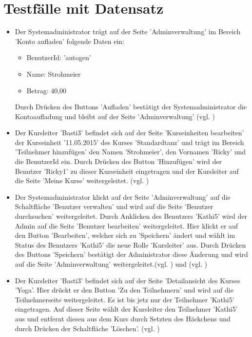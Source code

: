 \documentclass[a4paper]{scrreprt}
\newcounter{Lc}
\newcounter{Hc}
\newcommand{\stepHc}{\stepcounter{Hc}\setcounter{Lc}{0}}
\begin{document}
\section{Testfälle mit Datensatz}
			\stepHc
			\begin{itemize}
				
				\item {}
				Der Systemadministrator trägt auf der Seite 'Adminverwaltung' im Bereich 'Konto aufladen' folgende Daten ein:
				\begin{itemize}
					\item BenutzerId: 'autogen'
					\item Name: Strohmeier
					\item Betrag: 40,00
				\end{itemize}
				Durch Drücken des Buttons 'Aufladen' bestätigt der Systemadministrator die Kontoaufladung und bleibt auf der Seite 'Adminverwaltung' (vgl. )
				
				\item {}
				Der Kursleiter 'Basti3' befindet sich auf der Seite 'Kurseinheiten bearbeiten' der Kurseinheit '11.05.2015' des Kurses 'Standardtanz' und trägt im Bereich 'Teilnehmer hinzufügen' den Namen 'Strohmeier', den Vornamen 'Ricky' und die BenutzerId ein. Durch Drücken des Button 'Hinzufügen' wird der Benutzer 'Ricky1' zu dieser Kurseinheit eingetragen und der Kursleiter auf die Seite 'Meine Kurse' weitergeleitet. (vgl. )
						
				\item {} 
				Der Systemadministrator klickt auf der Seite 'Adminverwaltung' auf die Schaltfläche 'Benutzer verwalten' und wird auf die Seite 'Benutzer durchsuchen' weitergeleitet. Durch Anklicken des Benutzers 'Kathi5' wird der Admin auf die Seite 'Benutzer bearbeiten' weitergeleitet. Hier klickt er auf den Button 'Bearbeiten', welcher sich zu 'Speichern' ändert und wählt im Status des Benutzers 'Kathi5' die neue Rolle 'Kursleiter' aus. Durch Drücken des Buttons 'Speichern' bestätigt der Administrator diese Änderung und wird auf die Seite 'Adminverwaltung' weitergeleitet.(vgl. ) und (vgl. )
				
				\item {}
				Der Kursleiter 'Basti3' befindet sich auf der Seite 'Detailansicht des Kurses 'Yoga'. Hier drückt er den Button 'Zu den Teilnehmern' und wird auf die Teilnehmerseite weitergeleitet. Es ist bis jetz nur der Teilnehmer 'Kathi5' eingetragen. Auf dieser Seite wählt der Kursleiter den Teilnehmer 'Kathi5' aus und entfernt diesen aus dem Kurs durch Setzten des Häckchens und durch Drücken der Schaltfläche 'Löschen'. (vgl. )
				

\end{itemize}
\end{document}
